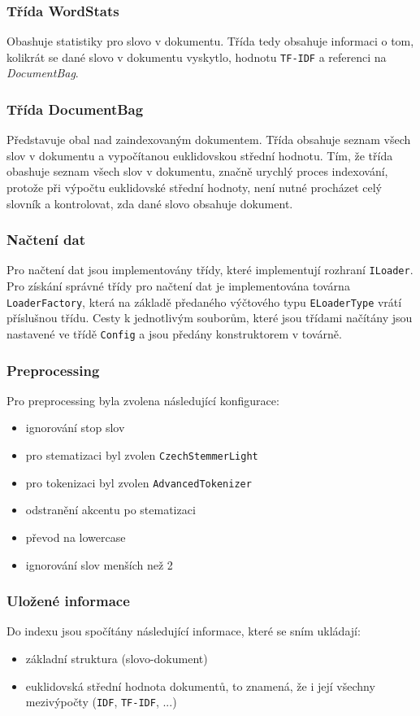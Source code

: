 \documentclass[12pt, a4paper]{article}
\begin{document}
\subsubsection{Třída WordStats}
\noindent Obashuje statistiky pro slovo v dokumentu. Třída tedy obsahuje informaci o tom, kolikrát se dané slovo v dokumentu vyskytlo, hodnotu \texttt{TF-IDF} a referenci na \textit{DocumentBag}.

\subsubsection{Třída DocumentBag}
\noindent Představuje obal nad zaindexovaným dokumentem. Třída obsahuje seznam všech slov v dokumentu a vypočítanou euklidovskou střední hodnotu. Tím, že třída obashuje seznam všech slov v dokumentu, značně urychlý proces indexování, protože při výpočtu euklidovské střední hodnoty, není nutné procházet celý slovník a kontrolovat, zda dané slovo obsahuje dokument.

\subsubsection{Načtení dat}
\noindent Pro načtení dat jsou implementovány třídy, které implementují rozhraní \texttt{ILoader}. Pro získání správné třídy pro načtení dat je implementována továrna \texttt{LoaderFactory}, která na základě předaného výčtového typu \texttt{ELoader\-Type} vrátí příslušnou třídu. Cesty k jednotlivým souborům, které jsou třídami načítány jsou nastavené ve třídě \texttt{Config} a jsou předány konstruktorem v továrně.

\subsubsection{Preprocessing}
\noindent Pro preprocessing byla zvolena následující konfigurace:
\begin{itemize}
	\item ignorování stop slov
	\item pro stematizaci byl zvolen \texttt{CzechStemmerLight}
	\item pro tokenizaci byl zvolen \texttt{AdvancedTokenizer}
	\item odstranění akcentu po stematizaci
	\item převod na lowercase
	\item ignorování slov menších než 2
\end{itemize}


\subsubsection{Uložené informace}
\noindent Do indexu jsou spočítány následující informace, které se sním ukládají:
\begin{itemize}
	\item základní struktura (slovo-dokument)
	\item euklidovská střední hodnota dokumentů, to znamená, že i její všechny mezivýpočty (\texttt{IDF}, \texttt{TF-IDF}, ...)
\end{itemize}
\end{document}
